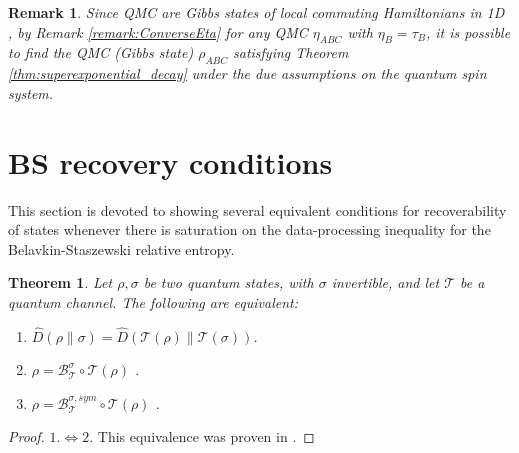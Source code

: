 \documentclass[11pt]{article}
\theoremstyle{newdefinition}
\theoremstyle{newplain}
\newtheorem{theorem}[definition]{Theorem}
\newtheorem{remark}[definition]{Remark}
\theoremstyle{myplain}
\DeclareMathOperator{\1}{\mathds{1}}
\newcommand{\PCR}[1]{{\color{blue}#1}}
\begin{document}
{{\begin{remark}
    Since QMC are Gibbs states of local commuting Hamiltonians in 1D \cite{brown-2012} , by Remark \ref{remark:ConverseEta} for any QMC $\eta_{ABC}$ with $\eta_B=\tau_B$, it is possible to find the QMC (Gibbs state) $\rho_{ABC}$ satisfying  Theorem \ref{thm:superexponential_decay} under the due assumptions on the quantum spin system.
\end{remark}

}

\section{BS recovery conditions}

This section is devoted to showing several equivalent conditions for recoverability of states whenever there is saturation on the data-processing inequality for the Belavkin-Staszewski relative entropy. 

\begin{theorem}\label{thm:equivalence_recovery_conditions}
    Let $\rho, \sigma$ be two quantum states, with $\sigma$ invertible, and let $\mathcal{T}$ be a quantum channel. The following are equivalent:
    \begin{enumerate}
        \item $\widehat{D}(\rho \| \sigma) = \widehat{D}(\mathcal{T}(\rho) \| \mathcal{T}(\sigma) ) $.
        \item $\rho=\mathcal{B}^\sigma_{\mathcal{T}} \circ \mathcal{T} (\rho)$ .
        \item $\rho =\mathcal{B}^{\sigma,sym}_{\mathcal{T}} \circ \mathcal{T} (\rho)$ .
    \end{enumerate}
\end{theorem}

\begin{proof}
    \underline{$1. \Leftrightarrow 2. $} This equivalence was proven in \cite{BluhmCapel-BSentropy-2019}.


\end{proof}}
\end{document}

